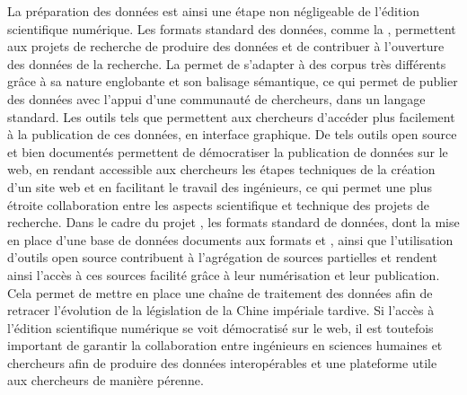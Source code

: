 La préparation des données est ainsi une étape non négligeable de l'édition scientifique numérique. Les formats standard des données, comme la \TEI, permettent aux projets de recherche de produire des données \fair et de contribuer à l'ouverture des données de la recherche. La \TEI permet de s'adapter à des corpus très différents grâce à sa nature englobante et son balisage sémantique, ce qui permet de publier des données avec l'appui d'une communauté de chercheurs, dans un langage standard. Les outils tels que \tp permettent aux chercheurs d'accéder plus facilement à la publication de ces données, en interface graphique. De tels outils open source et bien documentés permettent de démocratiser la publication de données sur le web, en rendant accessible aux chercheurs les étapes techniques de la création d'un site web et en facilitant le travail des ingénieurs, ce qui permet une plus étroite collaboration entre les aspects scientifique et technique des projets de recherche. Dans le cadre du projet \COREL, les formats standard de données, dont la mise en place d'une base de données documents aux formats \XML et \JSON, ainsi que l'utilisation d'outils open source contribuent à l'agrégation de sources partielles et rendent ainsi l'accès à ces sources facilité grâce à leur numérisation et leur publication. Cela permet de mettre en place une chaîne de traitement des données afin de retracer l'évolution de la législation de la Chine impériale tardive. Si l'accès à l'édition scientifique numérique se voit démocratisé sur le web, il est toutefois important de garantir la collaboration entre ingénieurs en sciences humaines et chercheurs afin de produire des données interopérables et une plateforme utile aux chercheurs de manière pérenne. 

